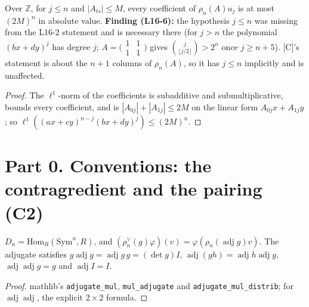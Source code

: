 \begin{lemma}\label{prop:symconv-bound}
  \leanok
  Over $\mathbb Z$, for $j\le n$ and $|A_{ts}|\le M$, every coefficient of $\rho_n(A)u_j$ is at most $(2M)^n$ in absolute
  value. \textbf{Finding (L16-6):} the hypothesis $j\le n$ was missing from the L16-2 statement and is necessary there
  (for $j>n$ the polynomial $(bx+dy)^j$ has degree $j$; $A=\bigl(\begin{smallmatrix}1&1\\1&1\end{smallmatrix}\bigr)$
  gives $\binom{j}{\lfloor j/2\rfloor}>2^n$ once $j\ge n+5$). [C]'s statement is about the $n+1$ columns of $\rho_n(A)$,
  so it has $j\le n$ implicitly and is unaffected.
\end{lemma}
\begin{proof}
  \leanok
  The $\ell^1$-norm of the coefficients is subadditive and submultiplicative, bounds every coefficient, and is
  $|A_{0j}|+|A_{1j}|\le2M$ on the linear form $A_{0j}x+A_{1j}y$; so $\ell^1((ax+cy)^{n-j}(bx+dy)^j)\le(2M)^n$.
\end{proof}

\chapter{Part 0. Conventions: the contragredient and the pairing (C2)}\label{ch:contragredient}

\begin{definition}[$\rho_n^\vee(g)=\rho_n(\operatorname{adj}g)^{\top}$]\label{def:contragredient}
  \leanok
  $D_n=\mathrm{Hom}_R(\mathrm{Sym}^n,R)$, and $(\rho_n^\vee(g)\varphi)(v)=\varphi(\rho_n(\operatorname{adj}g)v)$. The
  adjugate satisfies $g\operatorname{adj}g=\operatorname{adj}g\,g=(\det g)I$, $\operatorname{adj}(gh)=\operatorname{adj}h\operatorname{adj}g$,
  $\operatorname{adj}\operatorname{adj}g=g$ and $\operatorname{adj}I=I$.
\end{definition}
\begin{proof}
  \leanok
  mathlib's \texttt{adjugate\_mul}, \texttt{mul\_adjugate} and \texttt{adjugate\_mul\_distrib}; for $\operatorname{adj}\operatorname{adj}$, the explicit
  $2\times2$ formula.
\end{proof}

